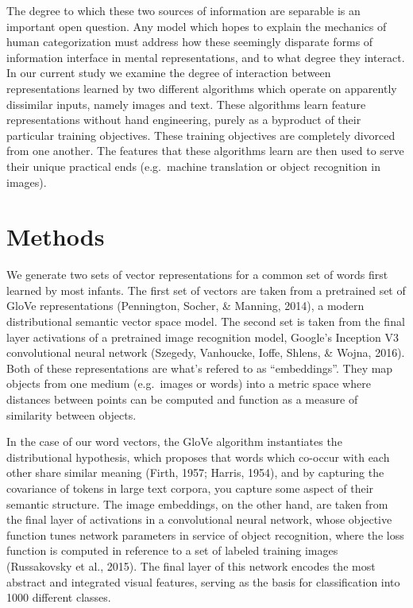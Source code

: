 \documentclass[10pt, letterpaper]{article}
\begin{document}
The degree to which these two sources of information are separable is an
important open question. Any model which hopes to explain the mechanics
of human categorization must address how these seemingly disparate forms
of information interface in mental representations, and to what degree
they interact. In our current study we examine the degree of interaction
between representations learned by two different algorithms which
operate on apparently dissimilar inputs, namely images and text. These
algorithms learn feature representations without hand engineering,
purely as a byproduct of their particular training objectives. These
training objectives are completely divorced from one another. The
features that these algorithms learn are then used to serve their unique
practical ends (e.g.~machine translation or object recognition in
images).

\section{Methods}\label{methods}

We generate two sets of vector representations for a common set of words
first learned by most infants. The first set of vectors are taken from a
pretrained set of GloVe representations (Pennington, Socher, \& Manning,
2014), a modern distributional semantic vector space model. The second
set is taken from the final layer activations of a pretrained image
recognition model, Google's Inception V3 convolutional neural network
(Szegedy, Vanhoucke, Ioffe, Shlens, \& Wojna, 2016). Both of these
representations are what's refered to as ``embeddings''. They map
objects from one medium (e.g.~images or words) into a metric space where
distances between points can be computed and function as a measure of
similarity between objects.

In the case of our word vectors, the GloVe algorithm instantiates the
distributional hypothesis, which proposes that words which co-occur with
each other share similar meaning (Firth, 1957; Harris, 1954), and by
capturing the covariance of tokens in large text corpora, you capture
some aspect of their semantic structure. The image embeddings, on the
other hand, are taken from the final layer of activations in a
convolutional neural network, whose objective function tunes network
parameters in service of object recognition, where the loss function is
computed in reference to a set of labeled training images (Russakovsky
et al., 2015). The final layer of this network encodes the most abstract
and integrated visual features, serving as the basis for classification
into 1000 different classes.
\end{document}
